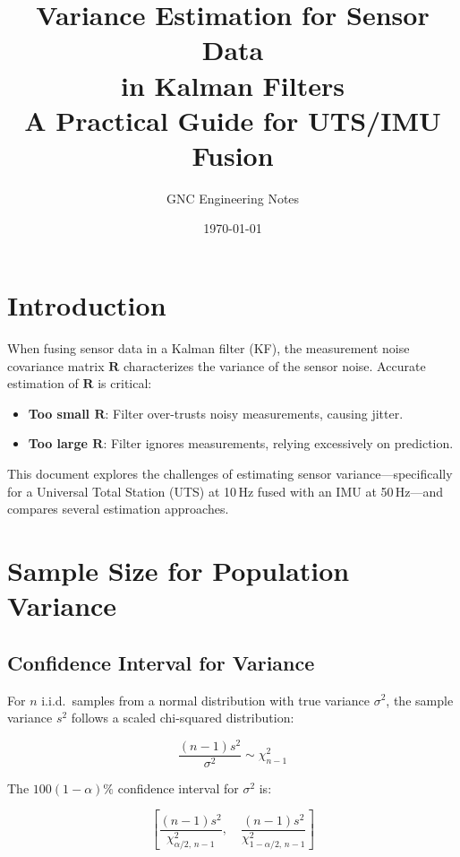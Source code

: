 \documentclass[11pt,a4paper]{article}
\title{\textbf{Variance Estimation for Sensor Data\\in Kalman Filters}\\[0.5em]
\large A Practical Guide for UTS/IMU Fusion}
\author{GNC Engineering Notes}
\date{\today}
\begin{document}
\maketitle
\tableofcontents
\newpage

\section{Introduction}

When fusing sensor data in a Kalman filter (KF), the measurement noise covariance matrix $\mathbf{R}$ characterizes the variance of the sensor noise. Accurate estimation of $\mathbf{R}$ is critical:
\begin{itemize}
    \item \textbf{Too small $\mathbf{R}$}: Filter over-trusts noisy measurements, causing jitter.
    \item \textbf{Too large $\mathbf{R}$}: Filter ignores measurements, relying excessively on prediction.
\end{itemize}

This document explores the challenges of estimating sensor variance---specifically for a Universal Total Station (UTS) at 10\,Hz fused with an IMU at 50\,Hz---and compares several estimation approaches.

\section{Sample Size for Population Variance}

\subsection{Confidence Interval for Variance}

For $n$ i.i.d.\ samples from a normal distribution with true variance $\sigma^2$, the sample variance $s^2$ follows a scaled chi-squared distribution:

\begin{equation}
    \frac{(n-1)s^2}{\sigma^2} \sim \chi^2_{n-1}
\end{equation}

The $100(1-\alpha)\%$ confidence interval for $\sigma^2$ is:

\begin{equation}
    \left[\frac{(n-1)s^2}{\chi^2_{\alpha/2,\,n-1}},\quad \frac{(n-1)s^2}{\chi^2_{1-\alpha/2,\,n-1}}\right]
\end{equation}
\end{document}
